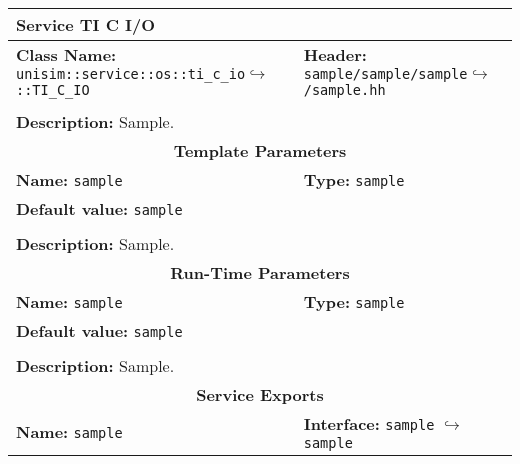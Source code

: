 \newpage
\begin{center}
	\begin{tabular}{|p{7.5cm}|p{7.5cm}|}
		\hline
		\multicolumn{2}{|l|}{\textbf{\Large Service TI C I/O}}\\
		\hline
		\multicolumn{1}{|p{7.5cm}}{\textbf{Class Name:} \newline \texttt{unisim::service::os::ti\_c\_io}\newline$\hookrightarrow$\texttt{::TI\_C\_IO}} & \multicolumn{1}{p{7.5cm}|}{\textbf{Header:} \newline \texttt{sample/sample/sample}\newline$\hookrightarrow$\texttt{/sample.hh}}\\
		\multicolumn{2}{|l|}{}\\
		\multicolumn{2}{|p{15cm}|}{\textbf{Description:} \newline Sample.}\\
		\hline
		\hline
		\multicolumn{2}{|c|}{\textbf{\large Template Parameters}}\\
		\hline
		\multicolumn{1}{|p{7.5cm}}{\textbf{Name:} \texttt{sample}} & \multicolumn{1}{p{7.5cm}|}{\textbf{Type:} \texttt{sample}}\\
		\multicolumn{2}{|p{15cm}|}{\textbf{Default value:} \texttt{sample}}\\
		\multicolumn{2}{|l|}{}\\
		\multicolumn{2}{|p{15cm}|}{\textbf{Description:} \newline Sample.}\\
		\hline
		\hline
		\multicolumn{2}{|c|}{\textbf{\large Run-Time Parameters}}\\
		\hline
		\multicolumn{1}{|p{7.5cm}}{\textbf{Name:} \texttt{sample}} & \multicolumn{1}{p{7.5cm}|}{\textbf{Type:} \texttt{sample}}\\
		\multicolumn{2}{|p{15cm}|}{\textbf{Default value:} \texttt{sample}}\\
		\multicolumn{2}{|l|}{}\\
		\multicolumn{2}{|p{15cm}|}{\textbf{Description:} \newline Sample.}\\
		\hline
		\hline
		\multicolumn{2}{|c|}{\textbf{\large Service Exports}}\\
		\hline
		\multicolumn{1}{|p{7.5cm}}{\textbf{Name:} \texttt{sample}} & \multicolumn{1}{p{7.5cm}|}{\textbf{Interface:} \newline \texttt{sample} \newline$\hookrightarrow$\texttt{sample}}\\

\end{tabular}
\end{center}
